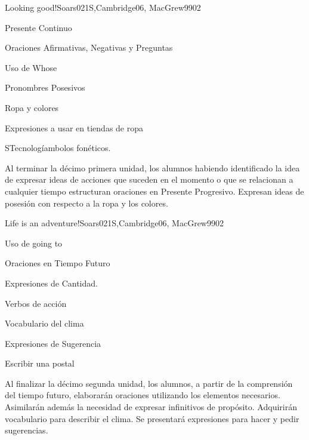 \begin{syllabus}
\begin{unit}{Looking good!}{}{Soars021S,Cambridge06, MacGrew99}{0}{2}
   \begin{topics}
      \item Presente Continuo
      \item Oraciones Afirmativas, Negativas y Preguntas
      \item Uso de Whose
      \item Pronombres Posesivos
      \item Ropa y colores
      \item Expresiones a usar en tiendas de ropa
      \item STecnologíambolos fonéticos.
   \end{topics}

   \begin{learningoutcomes}
      \item Al terminar la décimo primera unidad, los alumnos habiendo identificado la idea de expresar ideas de acciones que suceden en el momento o que se relacionan a cualquier tiempo estructuran oraciones en Presente Progresivo. Expresan ideas de posesión con respecto a la ropa y los colores.
   \end{learningoutcomes}

\end{unit}

\begin{unit}{Life is an adventure!}{}{Soars021S,Cambridge06, MacGrew99}{0}{2}
   \begin{topics}
      \item Uso de going to
      \item Oraciones en Tiempo Futuro
      \item Expresiones de Cantidad.
      \item Verbos de acción
      \item Vocabulario del clima
      \item Expresiones de Sugerencia
      \item Escribir una postal
   \end{topics}
   \begin{learningoutcomes}
      \item Al finalizar la décimo segunda unidad, los alumnos, a partir de la comprensión del tiempo futuro, elaborarán oraciones utilizando los elementos necesarios. Asimilarán además la necesidad de expresar infinitivos de propósito. Adquirirán vocabulario para describir el clima. Se presentará expresiones para hacer y pedir sugerencias.
   \end{learningoutcomes}
\end{unit}


\end{syllabus}

